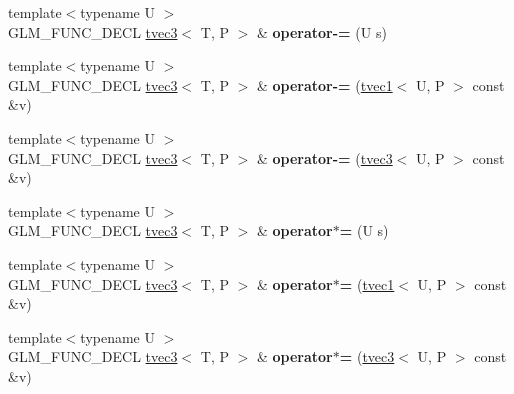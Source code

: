 \begin{DoxyCompactItemize}
\item 
\hypertarget{structglm_1_1tvec3_aaa69240a37af8d01685e5e04360fb18c}{{\footnotesize template$<$typename U $>$ }\\G\-L\-M\-\_\-\-F\-U\-N\-C\-\_\-\-D\-E\-C\-L \hyperlink{structglm_1_1tvec3}{tvec3}$<$ T, P $>$ \& {\bfseries operator-\/=} (U s)}\label{structglm_1_1tvec3_aaa69240a37af8d01685e5e04360fb18c}

\item 
\hypertarget{structglm_1_1tvec3_a8ebee86f6ea622e744ecedaf7e7db9ff}{{\footnotesize template$<$typename U $>$ }\\G\-L\-M\-\_\-\-F\-U\-N\-C\-\_\-\-D\-E\-C\-L \hyperlink{structglm_1_1tvec3}{tvec3}$<$ T, P $>$ \& {\bfseries operator-\/=} (\hyperlink{structglm_1_1tvec1}{tvec1}$<$ U, P $>$ const \&v)}\label{structglm_1_1tvec3_a8ebee86f6ea622e744ecedaf7e7db9ff}

\item 
\hypertarget{structglm_1_1tvec3_a356d8232f5a66a5e971ab1cb46593722}{{\footnotesize template$<$typename U $>$ }\\G\-L\-M\-\_\-\-F\-U\-N\-C\-\_\-\-D\-E\-C\-L \hyperlink{structglm_1_1tvec3}{tvec3}$<$ T, P $>$ \& {\bfseries operator-\/=} (\hyperlink{structglm_1_1tvec3}{tvec3}$<$ U, P $>$ const \&v)}\label{structglm_1_1tvec3_a356d8232f5a66a5e971ab1cb46593722}

\item 
\hypertarget{structglm_1_1tvec3_a3f6d5e9974493273c6770a92acd0cfc6}{{\footnotesize template$<$typename U $>$ }\\G\-L\-M\-\_\-\-F\-U\-N\-C\-\_\-\-D\-E\-C\-L \hyperlink{structglm_1_1tvec3}{tvec3}$<$ T, P $>$ \& {\bfseries operator$\ast$=} (U s)}\label{structglm_1_1tvec3_a3f6d5e9974493273c6770a92acd0cfc6}

\item 
\hypertarget{structglm_1_1tvec3_a8bf034f6ec15f8a4d316338cbe30d727}{{\footnotesize template$<$typename U $>$ }\\G\-L\-M\-\_\-\-F\-U\-N\-C\-\_\-\-D\-E\-C\-L \hyperlink{structglm_1_1tvec3}{tvec3}$<$ T, P $>$ \& {\bfseries operator$\ast$=} (\hyperlink{structglm_1_1tvec1}{tvec1}$<$ U, P $>$ const \&v)}\label{structglm_1_1tvec3_a8bf034f6ec15f8a4d316338cbe30d727}

\item 
\hypertarget{structglm_1_1tvec3_a924cfee1337bc2f0800519e5fbdf902f}{{\footnotesize template$<$typename U $>$ }\\G\-L\-M\-\_\-\-F\-U\-N\-C\-\_\-\-D\-E\-C\-L \hyperlink{structglm_1_1tvec3}{tvec3}$<$ T, P $>$ \& {\bfseries operator$\ast$=} (\hyperlink{structglm_1_1tvec3}{tvec3}$<$ U, P $>$ const \&v)}\label{structglm_1_1tvec3_a924cfee1337bc2f0800519e5fbdf902f}


\end{DoxyCompactItemize}
